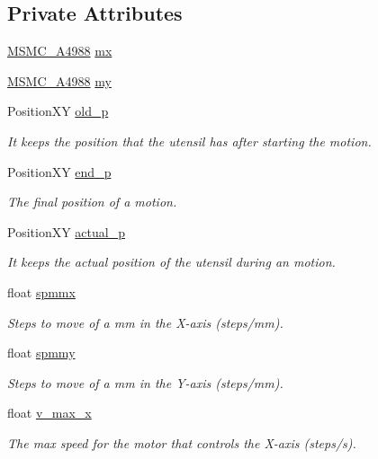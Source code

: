 \subsection*{Private Attributes}
\begin{DoxyCompactItemize}
\item 
\hyperlink{class_m_s_m_c___a4988}{M\+S\+M\+C\+\_\+\+A4988} \hyperlink{class_c_n_c___router_aa6009653314607491aa277b1f3c9bf85}{mx}
\item 
\hyperlink{class_m_s_m_c___a4988}{M\+S\+M\+C\+\_\+\+A4988} \hyperlink{class_c_n_c___router_ac3fb4521615d90ff7baa6bdb287d97c9}{my}
\item 
Position\+X\+Y \hyperlink{class_c_n_c___router_adbaa016d11134c9dcef28fc38ff391e1}{old\+\_\+p}
\begin{DoxyCompactList}\small\item\em It keeps the position that the utensil has after starting the motion. \end{DoxyCompactList}\item 
Position\+X\+Y \hyperlink{class_c_n_c___router_afbc343929f49271f65f1eda7d28b8957}{end\+\_\+p}
\begin{DoxyCompactList}\small\item\em The final position of a motion. \end{DoxyCompactList}\item 
Position\+X\+Y \hyperlink{class_c_n_c___router_a9e42e9ae1b2d5de3237706c2a8cf9440}{actual\+\_\+p}
\begin{DoxyCompactList}\small\item\em It keeps the actual position of the utensil during an motion. \end{DoxyCompactList}\item 
float \hyperlink{class_c_n_c___router_ad8830a7b387905027b8a1a9e3b31e3c7}{spmmx}
\begin{DoxyCompactList}\small\item\em Steps to move of a mm in the X-\/axis (steps/mm). \end{DoxyCompactList}\item 
float \hyperlink{class_c_n_c___router_ab44dd3a48e5c03f3484cd223cb8f9444}{spmmy}
\begin{DoxyCompactList}\small\item\em Steps to move of a mm in the Y-\/axis (steps/mm). \end{DoxyCompactList}\item 
float \hyperlink{class_c_n_c___router_afa08612e63f2cc3d3283fa06679b5d7a}{v\+\_\+max\+\_\+x}
\begin{DoxyCompactList}\small\item\em The max speed for the motor that controls the X-\/axis (steps/s). \end{DoxyCompactList}\item 

\end{DoxyCompactItemize}
